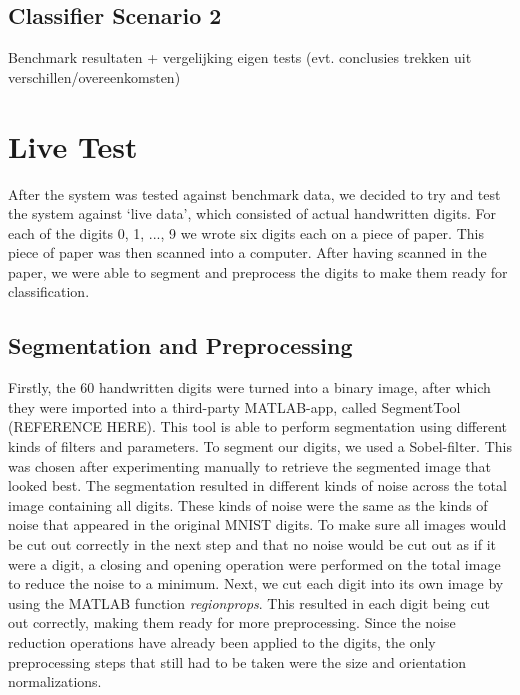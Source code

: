 \documentclass[11pt,twoside,a4paper]{article}
\begin{document}
\subsection{Classifier Scenario 2}
Benchmark resultaten + vergelijking eigen tests (evt. conclusies trekken uit verschillen/overeenkomsten)



\section{Live Test}
After the system was tested against benchmark data, we decided to try and test the system against `live data', which consisted of actual handwritten digits. For each of the digits 0, 1, ..., 9 we wrote six digits each on a piece of paper. This piece of paper was then scanned into a computer. After having scanned in the paper, we were able to segment and preprocess the digits to make them ready for classification.

\subsection{Segmentation and Preprocessing}
Firstly, the 60 handwritten digits were turned into a binary image, after which they were imported into a third-party MATLAB-app, called SegmentTool (REFERENCE HERE). This tool is able to perform segmentation using different kinds of filters and parameters. To segment our digits, we used a Sobel-filter. This was chosen after experimenting manually to retrieve the segmented image that looked best.\newline
\newline
The segmentation resulted in different kinds of noise across the total image containing all digits. These kinds of noise were the same as the kinds of noise that appeared in the original MNIST digits. To make sure all images would be cut out correctly in the next step and that no noise would be cut out as if it were a digit, a closing and opening operation were performed on the total image to reduce the noise to a minimum. Next, we cut each digit into its own image by using the MATLAB function \emph{regionprops}. This resulted in each digit being cut out correctly, making them ready for more preprocessing. Since the noise reduction operations have already been applied to the digits, the only preprocessing steps that still had to be taken were the size and orientation normalizations.
\end{document}
